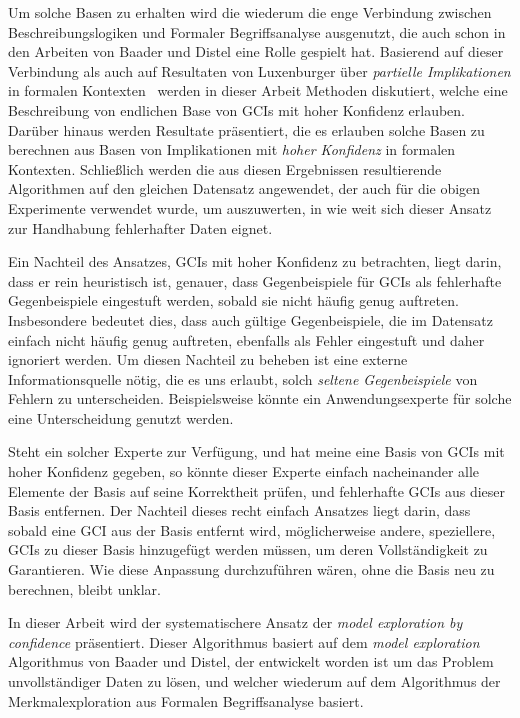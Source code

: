 \documentclass[ngerman,fleqn,DIV=12]{scrartcl}
\begin{document}
Um solche Basen zu erhalten wird die wiederum die enge Verbindung zwischen
Beschreibungslogiken und Formaler Begriffsanalyse ausgenutzt, die auch schon in den
Arbeiten von Baader und Distel eine Rolle gespielt hat.  Basierend auf dieser Verbindung
als auch auf Resultaten von Luxenburger über \emph{partielle Implikationen} in formalen
Kontexten~\cite{diss:Luxenburger} werden in dieser Arbeit Methoden diskutiert, welche eine
Beschreibung von endlichen Base von GCIs mit hoher Konfidenz erlauben.  Darüber hinaus
werden Resultate präsentiert, die es erlauben solche Basen zu berechnen aus Basen von
Implikationen mit \emph{hoher Konfidenz} in formalen Kontexten.  Schließlich werden die
aus diesen Ergebnissen resultierende Algorithmen auf den gleichen Datensatz angewendet,
der auch für die obigen Experimente verwendet wurde, um auszuwerten, in wie weit sich
dieser Ansatz zur Handhabung fehlerhafter Daten eignet.

Ein Nachteil des Ansatzes, GCIs mit hoher Konfidenz zu betrachten, liegt darin, dass er
rein heuristisch ist, genauer, dass Gegenbeispiele für GCIs als fehlerhafte Gegenbeispiele
eingestuft werden, sobald sie nicht häufig genug auftreten.  Insbesondere bedeutet dies,
dass auch gültige Gegenbeispiele, die im Datensatz einfach nicht häufig genug auftreten,
ebenfalls als Fehler eingestuft und daher ignoriert werden.  Um diesen Nachteil zu beheben
ist eine externe Informationsquelle nötig, die es uns erlaubt, solch \emph{seltene
  Gegenbeispiele} von Fehlern zu unterscheiden.  Beispielsweise könnte ein
Anwendungsexperte für solche eine Unterscheidung genutzt werden.

Steht ein solcher Experte zur Verfügung, und hat meine eine Basis von GCIs mit hoher
Konfidenz gegeben, so könnte dieser Experte einfach nacheinander alle Elemente der Basis
auf seine Korrektheit prüfen, und fehlerhafte GCIs aus dieser Basis entfernen.  Der
Nachteil dieses recht einfach Ansatzes liegt darin, dass sobald eine GCI aus der Basis
entfernt wird, möglicherweise andere, speziellere, GCIs zu dieser Basis hinzugefügt werden
müssen, um deren Vollständigkeit zu Garantieren.  Wie diese Anpassung durchzuführen wären,
ohne die Basis neu zu berechnen, bleibt unklar.

In dieser Arbeit wird der systematischere Ansatz der \emph{model exploration by
  confidence} präsentiert.  Dieser Algorithmus basiert auf dem \emph{model exploration}
Algorithmus von Baader und Distel, der entwickelt worden ist um das Problem
unvollständiger Daten zu lösen, und welcher wiederum auf dem Algorithmus der
Merkmalexploration aus Formalen Begriffsanalyse basiert.
\end{document}

